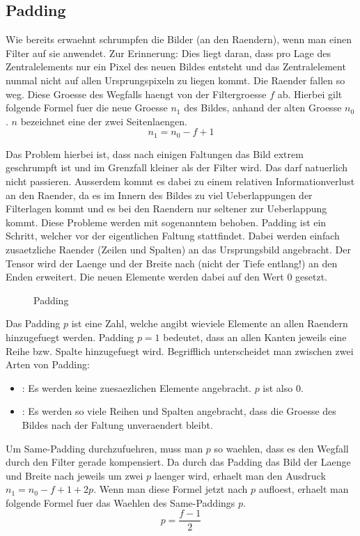 \subsection{Padding}
Wie bereits erwaehnt schrumpfen die Bilder (an den Raendern), wenn man einen Filter auf sie anwendet.
Zur Erinnerung: Dies liegt daran, dass pro Lage des Zentralelements nur ein Pixel
des neuen Bildes entsteht und das Zentralelement nunmal nicht auf allen
Ursprungspixeln zu liegen kommt. Die Raender fallen so weg. Diese Groesse des
Wegfalls haengt von der Filtergroesse $f$ ab. Hierbei gilt folgende Formel fuer die
neue Groesse $n_1$ des Bildes, anhand der alten Groesse $n_0$. $n$ bezeichnet
eine der zwei Seitenlaengen.
\begin{equation}
  n_1 = n_0 - f + 1
\end{equation}

Das Problem hierbei ist, dass nach einigen Faltungen das Bild extrem geschrumpft
ist und im Grenzfall kleiner als der Filter wird. Das darf natuerlich nicht
passieren. Ausserdem kommt es dabei zu einem relativen Informationverlust an den Raender, da es im
Innern des Bildes zu viel Ueberlappungen der Filterlagen kommt und es bei den
Raendern nur seltener zur Ueberlappung kommt.
\para{}
Diese Probleme werden mit sogenanntem  behoben. Padding ist ein
Schritt, welcher vor der eigentlichen Faltung stattfindet. Dabei werden einfach
zusaetzliche Raender (Zeilen und Spalten) an das Ursprungsbild angebracht. Der
Tensor wird der Laenge und der Breite nach (nicht der Tiefe entlang!) an den Enden erweitert. Die neuen Elemente werden dabei auf den Wert
$0$ gesetzt.

\begin{figure}[h!]

  \caption{Padding}
\end{figure}

Das Padding $p$ ist eine Zahl, welche angibt wieviele Elemente an allen Raendern
hinzugefuegt werden. Padding $p = 1$ bedeutet, dass an allen Kanten jeweils eine
Reihe bzw. Spalte hinzugefuegt wird.
Begrifflich unterscheidet man zwischen zwei Arten von Padding:
\begin{itemize}
\item{: Es werden keine zuesaezlichen Elemente angebracht. $p$ ist also 0.}
\item{: Es werden so viele Reihen und Spalten angebracht, dass
    die Groesse des Bildes nach der Faltung unveraendert bleibt.}
\end{itemize}
\para{}
Um Same-Padding durchzufuehren, muss man $p$ so waehlen, dass es den Wegfall durch
den Filter gerade kompensiert. Da durch das Padding das Bild der Laenge und
Breite nach jeweils um zwei $p$ laenger wird, erhaelt man den Ausdruck $n_1 =
n_0 - f + 1 + 2p$. Wenn man diese Formel jetzt nach $p$ aufloest,
erhaelt man folgende Formel fuer das Waehlen des Same-Paddings $p$.
\\
\begin{equation}
  p = \frac{f-1}{2}
\end{equation}

